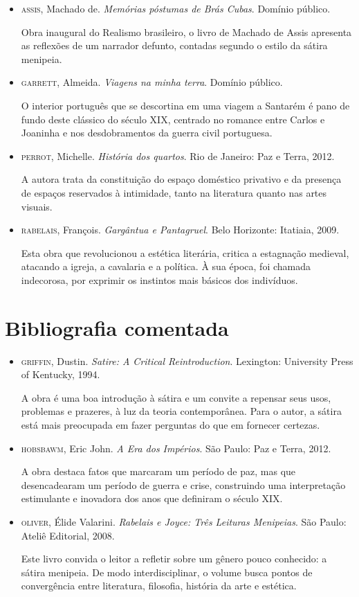 \documentclass[12pt]{extarticle}
\begin{document}
\begin{itemize}
\item\textsc{assis}, Machado de. \textit{Memórias póstumas de Brás Cubas}. Domínio
público.

Obra inaugural do Realismo brasileiro, o livro de Machado de Assis
apresenta as reflexões de um narrador defunto, contadas segundo o estilo
da sátira menipeia.

\item\textsc{garrett}, Almeida. \textit{Viagens na minha terra}. Domínio público.

O interior português que se descortina em uma viagem a Santarém é pano
de fundo deste clássico do século XIX, centrado no romance entre Carlos
e Joaninha e nos desdobramentos da guerra civil portuguesa.

\item\textsc{perrot}, Michelle. \textit{História dos quartos}. Rio de Janeiro: Paz e
Terra, 2012.

A autora trata da constituição do espaço doméstico privativo e da
presença de espaços reservados à intimidade, tanto na literatura quanto
nas artes visuais.

\item\textsc{rabelais}, François. \textit{Gargântua e Pantagruel}. Belo Horizonte:
Itatiaia, 2009.

Esta obra que revolucionou a estética literária, critica a estagnação
medieval, atacando a igreja, a cavalaria e a política. À sua época, foi
chamada indecorosa, por exprimir os instintos mais básicos dos
indivíduos.
\end{itemize}

\section{Bibliografia comentada}

\begin{itemize}
\item\textsc{griffin}, Dustin. \textit{Satire: A Critical Reintroduction}. Lexington:
University Press of Kentucky, 1994.

A obra é uma boa introdução à sátira e um convite a repensar seus usos,
problemas e prazeres, à luz da teoria contemporânea. Para o autor, a
sátira está mais preocupada em fazer perguntas do que em fornecer
certezas.

\item\textsc{hobsbawm}, Eric John. \textit{A Era dos Impérios}. São Paulo: Paz e Terra, 2012.

A obra destaca fatos que marcaram um período de paz, mas que
desencadearam um período de guerra e crise, construindo uma
interpretação estimulante e inovadora dos anos que definiram o século
XIX.

\item\textsc{oliver}, Élide Valarini. \textit{Rabelais e Joyce: Três Leituras
Menipeias}. São Paulo: Ateliê Editorial, 2008.

Este livro convida o leitor a refletir sobre um gênero pouco conhecido:
a sátira menipeia. De modo interdisciplinar, o volume busca pontos de
convergência entre literatura, filosofia, história da arte e estética.
\end{itemize}
\end{document}
